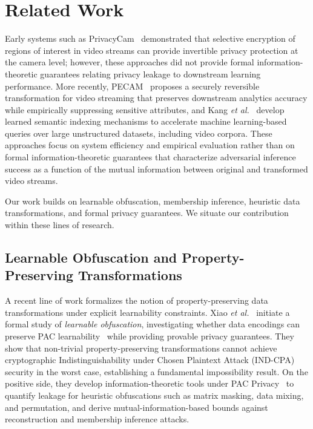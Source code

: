 \documentclass[letterpaper]{article} %
\begin{document}

\section{Related Work}
 Early systems such as PrivacyCam~\cite{chattopadhyay2007privacycam} demonstrated that selective encryption of regions of interest in video streams can provide invertible privacy protection at the camera level; however, these approaches did not provide formal information-theoretic guarantees relating privacy leakage to downstream learning performance. More recently, PECAM~\cite{wu2021pecam} proposes a securely reversible transformation for video streaming that preserves downstream analytics accuracy while empirically suppressing sensitive attributes, and Kang \textit{et al.}~\cite{kang2020semantic} develop learned semantic indexing mechanisms to accelerate machine learning-based queries over large unstructured datasets, including video corpora. These approaches focus on system efficiency and empirical evaluation rather than on formal information-theoretic guarantees that characterize adversarial inference success as a function of the mutual information between original and transformed video streams.
 
Our work builds on learnable obfuscation, membership inference, heuristic data transformations, and formal privacy guarantees. We situate our contribution within these lines of research. 

\subsection{Learnable Obfuscation and Property-Preserving Transformations}

A recent line of work formalizes the notion of property-preserving data transformations under explicit learnability constraints. Xiao \textit{et al.}~\cite{xiao2024formal} initiate a formal study of \emph{learnable obfuscation}, investigating whether data encodings can preserve PAC learnability~\cite{valiant1984theory} while providing provable privacy guarantees. They show that non-trivial property-preserving transformations cannot achieve cryptographic Indistinguishability under Chosen Plaintext Attack (IND-CPA) security in the worst case, establishing a fundamental impossibility result. On the positive side, they develop information-theoretic tools under PAC Privacy~\cite{xiao2023pacprivacy} to quantify leakage for heuristic obfuscations such as matrix masking, data mixing, and permutation, and derive mutual-information-based bounds against reconstruction and membership inference attacks.
\end{document}
